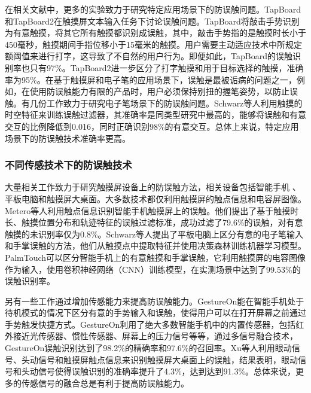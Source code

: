 在相关文献中，更多的实验致力于研究特定应用场景下的防误触问题。TapBoard\cite{2013-TapBoard}和TapBoard2\cite{2016-TapBoard2}在触摸屏文本输入任务下讨论误触问题。TapBoard将敲击手势识别为有意触摸，将其它所有触摸都识别成误触，其中，敲击手势指的是触摸时长小于450毫秒，触摸期间手指位移小于15毫米的触摸。用户需要主动适应技术中所规定额阈值来进行打字，这导致了不自然的用户行为。即便如此，TapBoard的误触识别率也只有97\%。TapBoard2进一步区分了打字触摸和用于目标选择的触摸，准确率为95\%。在基于触摸屏和电子笔的应用场景下，误触是最被诟病的问题之一\cite{2014-PenMightier}，例如，在使用防误触能力有限的产品时，用户必须保持别扭的握笔姿势，以防止误触。有几份工作致力于研究电子笔场景下的防误触问题\cite{2013-PalmInput,2014-PenUnint,2014-PalmRejection}。Schwarz等人利用触摸的时空特征来训练误触过滤器，其准确率是同类型研究中最高的，能够将误触和有意交互的比例降低到0.016，同时正确识别98\%的有意交互。总体上来说，特定应用场景下的防误触技术准确率更高。

\subsubsection{不同传感技术下的防误触技术}

大量相关工作致力于研究触摸屏设备上的防误触方法，相关设备包括智能手机 \cite{matero2012identifying,2015-GestureOn,2018-PalmTouch,2019-BeyondUnint}、平板电脑\cite{2006-PadUnint,2014-PenUnint, 2014-PalmRejection, 2013-TapBoard, 2016-TapBoard2}和触摸屏大桌面\cite{2020-TabletopTouch}。大多数技术都仅利用触摸屏的触点信息\cite{matero2012identifying,2006-PadUnint,2014-PalmRejection,2013-TapBoard,2016-TapBoard2}和电容屏图像\cite{2018-PalmTouch,2014-PenUnint}。Metero等人利用触点信息识别智能手机触摸屏上的误触\cite{matero2012identifying}。他们提出了基于触摸时长、触摸位置分布和轨迹特征的误触过滤标准，成功过滤了79.6\%的误触，对有意触摸的未识别率仅为0.8\%。Schwarz等人提出了平板电脑上区分有意的电子笔输入和手掌误触的方法\cite{2014-PalmRejection}，他们从触摸点中提取特征并使用决策森林训练机器学习模型。PalmTouch\cite{2018-PalmTouch}可以区分智能手机上的有意触摸和手掌误触，它利用触摸屏的电容图像作为输入，使用卷积神经网络（CNN）训练模型，在实测场景中达到了99.53\%的误触识别率。

另有一些工作通过增加传感能力来提高防误触能力\cite{2015-GestureOn,2020-TabletopTouch,2001-PalmPressure,2019-BeyondUnint}。GestureOn\cite{2015-GestureOn}能在智能手机处于待机模式的情况下区分有意的手势输入和误触，使得用户可以在打开屏幕之前通过手势触发快捷方式。GestureOn利用了绝大多数智能手机中的内置传感器，包括红外接近光传感器、惯性传感器、屏幕上的压力信号等等，通过多信号融合技术，GestureOn误触识别达到了98.2\%的精确率和97.6\%的召回率。Xu等人利用眼动信号、头动信号和触摸屏触点信息来识别触摸屏大桌面上的误触，结果表明，眼动信号和头动信号使得误触识别的准确率提升了4.3\%，达到达到91.3\%。总体来说，更多的传感信号的融合总是有利于提高防误触能力。

